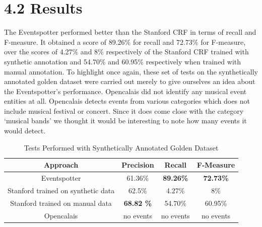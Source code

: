 \documentclass[a4paper,11pt]{report}
\begin{document}
\section*{4.2 Results}

The Eventspotter performed better than the Stanford CRF in terms of recall and F-measure. It obtained a score of 89.26\% for recall and 72.73\% for F-measure, over the scores of 4.27\% and 8\% respectively of the Stanford CRF trained with synthetic annotation and 54.70\% and 60.95\% respectively when trained with manual annotation. To highlight once again, these set of tests on the synthetically annotated golden dataset were carried out merely to give ourselves an idea about the Eventspotter's performance. Opencalais did not identify any musical event entities at all. Opencalais detects events from various categories which does not include musical festival or concert. Since it does come close with the category `musical bands' we thought it would be interesting to note how many events it would detect. 
\begin{table}[ht]
\caption{Tests Performed with Synthetically Annotated Golden Dataset} %
\centering %
\begin{tabular}{c c c c} %
\hline\hline %
Approach & Precision & Recall & F-Measure \\ [0.5ex] %
\hline %
Eventspotter & 61.36\% & \bf 89.26\% \bf & \bf 72.73\% \bf \\ %
Stanford trained on synthetic data &  62.5\% & 4.27\% & 8\%\\
Stanford trained on manual data & \bf 68.82 \bf \% & 54.70\% & 60.95\%  \\
Opencalais & no events & no events & no events \\
\hline %
\end{tabular}
\label{table:nonlin} %
\end{table}
\end{document}
